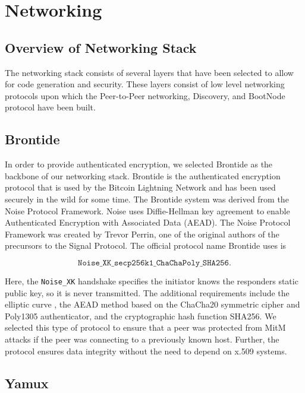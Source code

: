 \section{Networking}

\subsection{Overview of Networking Stack}

The networking stack consists of several layers that have been selected
to allow for code generation and security.
These layers consist of low level networking protocols upon which the
Peer-to-Peer networking, Discovery, and BootNode protocol have been built.

\subsection{Brontide}

In order to provide authenticated encryption, we selected Brontide as
the backbone of our networking stack.
Brontide is the authenticated encryption protocol that is used by the
Bitcoin Lightning Network and has been used securely in the wild for some time.
The Brontide system was derived from the Noise Protocol Framework.
Noise uses Diffie-Hellman key agreement to enable Authenticated
Encryption with Associated Data (AEAD).
The Noise Protocol Framework was created by Trevor Perrin, one of the
original authors of the precursors to the Signal Protocol.
The official protocol name Brontide uses is

\begin{equation*}
\texttt{Noise\_XK\_secp256k1\_ChaChaPoly\_SHA256}.
\end{equation*}

\noindent
Here, the \texttt{Noise\_XK} handshake specifies the initiator knows the
responders static public key, so it is never transmitted.
The additional requirements include the elliptic curve \secp{}, the
AEAD method based on the ChaCha20 symmetric cipher and Poly1305
authenticator, and the cryptographic hash function SHA256.
We selected this type of protocol to ensure that a peer was protected
from MitM attacks if the peer was connecting to a previously known host.
Further, the protocol ensures data integrity without the need to depend
on x.509 systems.

\subsection{Yamux}

